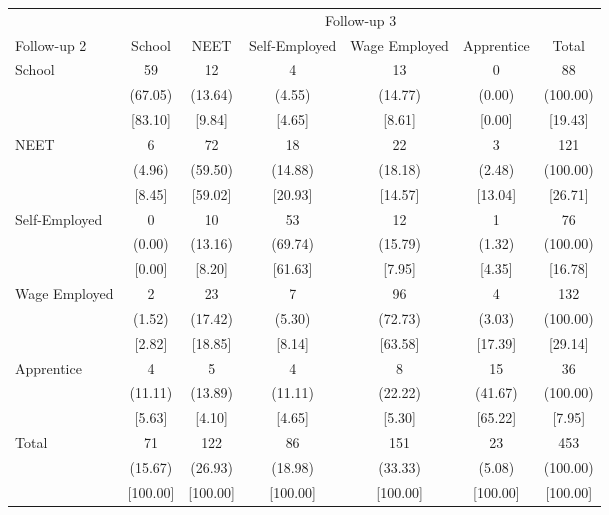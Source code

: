 {
\def\sym#1{\ifmmode^{#1}\else\(^{#1}\)\fi}
\begin{tabular}{l*{6}{c}}
\hline\hline
            &\multicolumn{6}{c}{Follow-up 3}                                              \\
Follow-up 2 &      School&        NEET&Self-Employed&Wage Employed&  Apprentice&       Total\\
\hline
School      &          59&          12&           4&          13&           0&          88\\
            &     (67.05)&     (13.64)&      (4.55)&     (14.77)&      (0.00)&    (100.00)\\
            &     [83.10]&      [9.84]&      [4.65]&      [8.61]&      [0.00]&     [19.43]\\
NEET        &           6&          72&          18&          22&           3&         121\\
            &      (4.96)&     (59.50)&     (14.88)&     (18.18)&      (2.48)&    (100.00)\\
            &      [8.45]&     [59.02]&     [20.93]&     [14.57]&     [13.04]&     [26.71]\\
Self-Employed&           0&          10&          53&          12&           1&          76\\
            &      (0.00)&     (13.16)&     (69.74)&     (15.79)&      (1.32)&    (100.00)\\
            &      [0.00]&      [8.20]&     [61.63]&      [7.95]&      [4.35]&     [16.78]\\
Wage Employed&           2&          23&           7&          96&           4&         132\\
            &      (1.52)&     (17.42)&      (5.30)&     (72.73)&      (3.03)&    (100.00)\\
            &      [2.82]&     [18.85]&      [8.14]&     [63.58]&     [17.39]&     [29.14]\\
Apprentice  &           4&           5&           4&           8&          15&          36\\
            &     (11.11)&     (13.89)&     (11.11)&     (22.22)&     (41.67)&    (100.00)\\
            &      [5.63]&      [4.10]&      [4.65]&      [5.30]&     [65.22]&      [7.95]\\
Total       &          71&         122&          86&         151&          23&         453\\
            &     (15.67)&     (26.93)&     (18.98)&     (33.33)&      (5.08)&    (100.00)\\
            &    [100.00]&    [100.00]&    [100.00]&    [100.00]&    [100.00]&    [100.00]\\
\hline\hline
\end{tabular}
}
